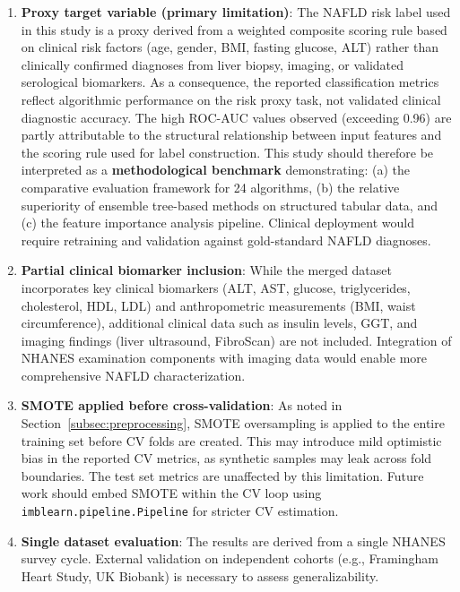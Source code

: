 \documentclass[conference,10pt]{IEEEtran}
\begin{document}
\begin{enumerate}
    \item \textbf{Proxy target variable (primary limitation)}: The NAFLD risk label used in this study is a proxy derived from a weighted composite scoring rule based on clinical risk factors (age, gender, BMI, fasting glucose, ALT) rather than clinically confirmed diagnoses from liver biopsy, imaging, or validated serological biomarkers. As a consequence, the reported classification metrics reflect algorithmic performance on the risk proxy task, not validated clinical diagnostic accuracy. The high ROC-AUC values observed (exceeding 0.96) are partly attributable to the structural relationship between input features and the scoring rule used for label construction. This study should therefore be interpreted as a \textbf{methodological benchmark} demonstrating: (a) the comparative evaluation framework for 24 algorithms, (b) the relative superiority of ensemble tree-based methods on structured tabular data, and (c) the feature importance analysis pipeline. Clinical deployment would require retraining and validation against gold-standard NAFLD diagnoses.

    \item \textbf{Partial clinical biomarker inclusion}: While the merged dataset incorporates key clinical biomarkers (ALT, AST, glucose, triglycerides, cholesterol, HDL, LDL) and anthropometric measurements (BMI, waist circumference), additional clinical data such as insulin levels, GGT, and imaging findings (liver ultrasound, FibroScan) are not included. Integration of NHANES examination components with imaging data would enable more comprehensive NAFLD characterization.

    \item \textbf{SMOTE applied before cross-validation}: As noted in Section~\ref{subsec:preprocessing}, SMOTE oversampling is applied to the entire training set before CV folds are created. This may introduce mild optimistic bias in the reported CV metrics, as synthetic samples may leak across fold boundaries. The test set metrics are unaffected by this limitation. Future work should embed SMOTE within the CV loop using \texttt{imblearn.pipeline.Pipeline} for stricter CV estimation.

    \item \textbf{Single dataset evaluation}: The results are derived from a single NHANES survey cycle. External validation on independent cohorts (e.g., Framingham Heart Study, UK Biobank) is necessary to assess generalizability.


\end{enumerate}
\end{document}

